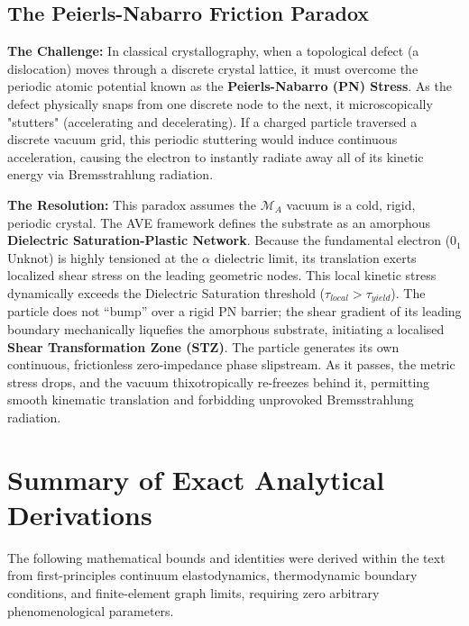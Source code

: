 \section{The Peierls-Nabarro Friction Paradox}
\textbf{The Challenge:} In classical crystallography, when a topological defect (a dislocation) moves through a discrete crystal lattice, it must overcome the periodic atomic potential known as the \textbf{Peierls-Nabarro (PN) Stress}. As the defect physically snaps from one discrete node to the next, it microscopically "stutters" (accelerating and decelerating). If a charged particle traversed a discrete vacuum grid, this periodic stuttering would induce continuous acceleration, causing the electron to instantly radiate away all of its kinetic energy via Bremsstrahlung radiation.

\textbf{The Resolution:} This paradox assumes the $\mathcal{M}_A$ vacuum is a cold, rigid, periodic crystal. The AVE framework defines the substrate as an amorphous \textbf{Dielectric Saturation-Plastic Network}. Because the fundamental electron ($0_1$ Unknot) is highly tensioned at the $\alpha$ dielectric limit, its translation exerts localized shear stress on the leading geometric nodes. This local kinetic stress dynamically exceeds the Dielectric Saturation threshold ($\tau_{local} > \tau_{yield}$). The particle does not ``bump'' over a rigid PN barrier; the shear gradient of its leading boundary mechanically liquefies the amorphous substrate, initiating a localised \textbf{Shear Transformation Zone (STZ)}. The particle generates its own continuous, frictionless zero-impedance phase slipstream. As it passes, the metric stress drops, and the vacuum thixotropically re-freezes behind it, permitting smooth kinematic translation and forbidding unprovoked Bremsstrahlung radiation.

\chapter{Summary of Exact Analytical Derivations}

The following mathematical bounds and identities were derived within the text from first-principles continuum elastodynamics, thermodynamic boundary conditions, and finite-element graph limits, requiring zero arbitrary phenomenological parameters.

